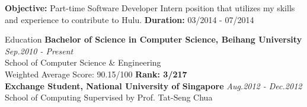 \documentclass{resume} %
\begin{document}
{\bf Objective: }Part-time Software Developer Intern position that utilizes my skills and experience to contribute to Hulu.
{\bf Duration: } 03/2014 - 07/2014

\begin{rSection}{Education}
{\bf Bachelor of Science in Computer Science, Beihang University} \hfill {\em Sep.2010 - Present} \\
School of Computer Science \& Engineering \\
Weighted Average Score: 90.15/100 \textbf{Rank: 3/217}\\
{\bf Exchange Student, National University of Singapore} \hfill {\em Aug.2012 - Dec.2012} \\
School of Computing \hfill Supervised by Prof. Tat-Seng Chua \\

\end{rSection}

\end{document}
